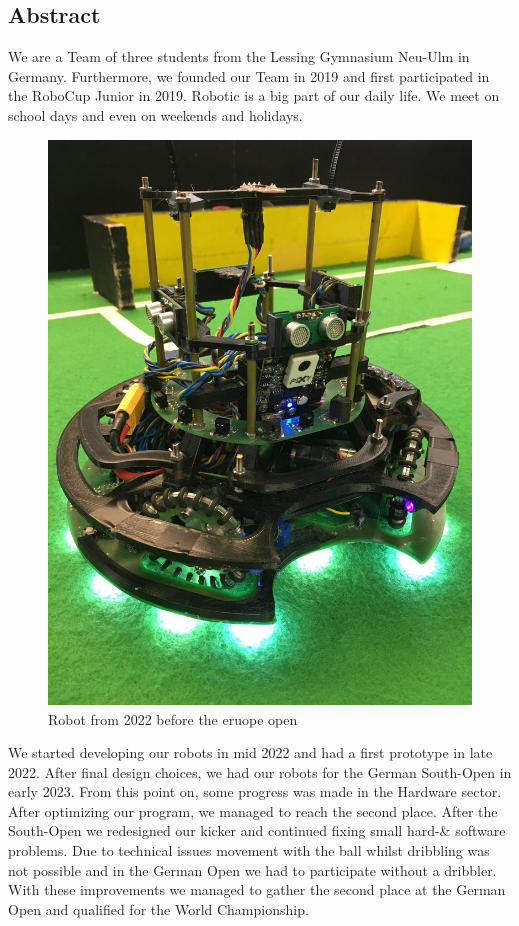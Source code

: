\documentclass{scrartcl}
\begin{document}
\subsection{Abstract}
We are a Team of three students from the Lessing Gymnasium Neu-Ulm in Germany. Furthermore, we founded our Team
in 2019 and first participated in the RoboCup Junior in 2019. Robotic is a big part of our daily life.
We meet on school days and even on weekends and holidays.

\begin{figure}
    \centering
    \includegraphics[width=\textwidth]{img/LWLBot.png}
    \caption{Robot from 2022 before the eruope open}
    \label{fig:LWLBot}
\end{figure}


We started developing our robots in mid 2022 and had a first prototype in late 2022. After final design
choices, we had our robots for the German South-Open in early 2023. From this point on, some progress was
made in the Hardware sector.
After optimizing our program, we managed to reach the second place.
\newline
After the South-Open we redesigned our kicker and continued fixing small hard-\& software problems. Due to technical issues movement with the ball whilst dribbling was
not possible and in the German Open we had to participate without a dribbler.
With these improvements we managed to gather the second place at the German Open and qualified for the World Championship.
\end{document}
